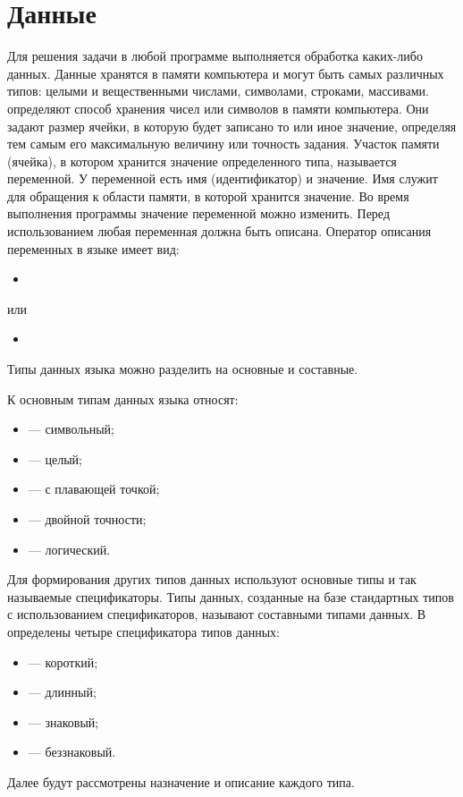 \section[Данные]{Данные}
Для решения задачи в любой программе выполняется обработка каких-либо данных. Данные хранятся в памяти компьютера и
могут быть самых различных типов: целыми и вещественными числами, символами, строками, массивами.  определяют способ хранения чисел или символов в памяти компьютера. Они задают
размер ячейки, в которую будет записано то или иное значение, определяя тем самым его максимальную величину или
точность задания. Участок памяти (ячейка), в котором хранится значение определенного типа, называется
переменной. У переменной есть имя
(идентификатор) и значение. Имя служит для обращения к области памяти, в
которой хранится значение. Во время выполнения программы значение переменной можно изменить. Перед использованием любая
переменная должна быть описана. Оператор описания переменных в языке 
имеет вид:
\begin{itemize}
\item[] 
\end{itemize}
или
\begin{itemize}
\item[] 
\end{itemize}

Типы данных языка  можно разделить на основные и составные.

К основным типам данных языка относят:
\begin{itemize}
\item {} --- символьный; 
\item {} --- целый; 
\item {} --- с плавающей точкой; 
\item {} --- двойной точности; 
\item {} --- логический.
\end{itemize}
Для формирования других типов данных используют основные типы и так называемые спецификаторы. Типы данных, созданные на
базе стандартных типов с использованием спецификаторов, называют составными типами данных. 
В  определены четыре спецификатора типов данных:
\begin{itemize}
\item {} --- короткий;
\item {} --- длинный;
\item {} --- знаковый;
\item {} --- беззнаковый.
\end{itemize}
Далее будут рассмотрены назначение и описание каждого типа.

